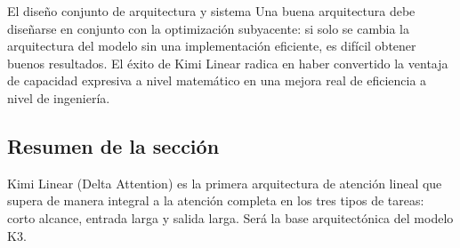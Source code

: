\begin{warningbox}{El diseño conjunto de arquitectura y sistema}
Una buena arquitectura debe diseñarse en conjunto con la optimización subyacente: si solo se cambia la arquitectura del modelo sin una implementación eficiente, es difícil obtener buenos resultados. El éxito de Kimi Linear radica en haber convertido la ventaja de capacidad expresiva a nivel matemático en una mejora real de eficiencia a nivel de ingeniería.
\end{warningbox}

\subsection{Resumen de la sección}

Kimi Linear (Delta Attention) es la primera arquitectura de atención lineal que supera de manera integral a la atención completa en los tres tipos de tareas: corto alcance, entrada larga y salida larga. Será la base arquitectónica del modelo K3.

